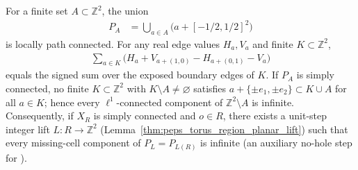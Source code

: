 
\begin{lemma}%
    \label{thm:peps_integer_cell_no_holes}
    \leanok
    For a finite set $A\subset\mathbb Z^2$, the union
    \begin{align}
        P_A & =\bigcup_{a\in A}\bigl(a+[-1/2,1/2]^2\bigr)
        \label{eq:peps_integer_cell_union}
    \end{align}
    is locally path connected. For any real edge values $H_a,V_a$ and finite $K\subset\mathbb Z^2$,
    \begin{align}
        \sum_{a\in K}\bigl(H_a+V_{a+(1,0)}-H_{a+(0,1)}-V_a\bigr)
        \label{eq:peps_integer_grid_curl}
    \end{align}
    equals the signed sum over the exposed boundary edges of $K$. If $P_A$ is simply connected, no finite $K\subset\mathbb Z^2$ with $K\setminus A\ne\varnothing$ satisfies $a+\{\pm e_1,\pm e_2\}\subset K\cup A$ for all $a\in K$; hence every $\ell^1$-connected component of $\mathbb Z^2\setminus A$ is infinite. Consequently, if $X_R$ is simply connected and $o\in R$, there exists a unit-step integer lift $L:R\to\mathbb Z^2$ (Lemma~\ref{thm:peps_torus_region_planar_lift}) such that every missing-cell component of $P_L=P_{L(R)}$ is infinite (an auxiliary no-hole step for \cite[Theorem~6.9]{Schuch2010PEPS}).
\end{lemma}
